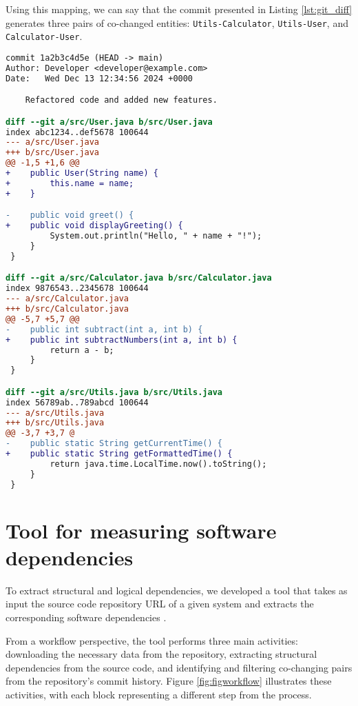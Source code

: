 Using this mapping, we can say that the commit presented in Listing \ref{lst:git_diff} generates three pairs of co-changed entities: \texttt{Utils-Calculator}, \texttt{Utils-User}, and \texttt{Calculator-User}.

\begin{lstlisting}[language=diff, caption={Example output of \texttt{git diff} between two commits.}, label={lst:git_diff}]
commit 1a2b3c4d5e (HEAD -> main)
Author: Developer <developer@example.com>
Date:   Wed Dec 13 12:34:56 2024 +0000

    Refactored code and added new features.

diff --git a/src/User.java b/src/User.java
index abc1234..def5678 100644
--- a/src/User.java
+++ b/src/User.java
@@ -1,5 +1,6 @@
+    public User(String name) {
+        this.name = name;
+    }

-    public void greet() {
+    public void displayGreeting() {
         System.out.println("Hello, " + name + "!");
     }
 }

diff --git a/src/Calculator.java b/src/Calculator.java
index 9876543..2345678 100644
--- a/src/Calculator.java
+++ b/src/Calculator.java
@@ -5,7 +5,7 @@ 
-    public int subtract(int a, int b) {
+    public int subtractNumbers(int a, int b) {
         return a - b;
     }
 }

diff --git a/src/Utils.java b/src/Utils.java
index 56789ab..789abcd 100644
--- a/src/Utils.java
+++ b/src/Utils.java
@@ -3,7 +3,7 @
-    public static String getCurrentTime() {
+    public static String getFormattedTime() {
         return java.time.LocalTime.now().toString();
     }
 }
\end{lstlisting}




\section{Tool for measuring software dependencies}
\label{subsec:tool_measuring_dependencies}

To extract structural and logical dependencies, we developed a tool that takes as input the source code repository URL of a given system and extracts the corresponding software dependencies \cite{DepSACI, enase19}. 

From a workflow perspective, the tool performs three main activities: downloading the necessary data from the repository, extracting structural dependencies from the source code, and identifying and filtering co-changing pairs from the repository's commit history. Figure \ref{fig:figworkflow} illustrates these activities, with each block representing a different step from the process.


